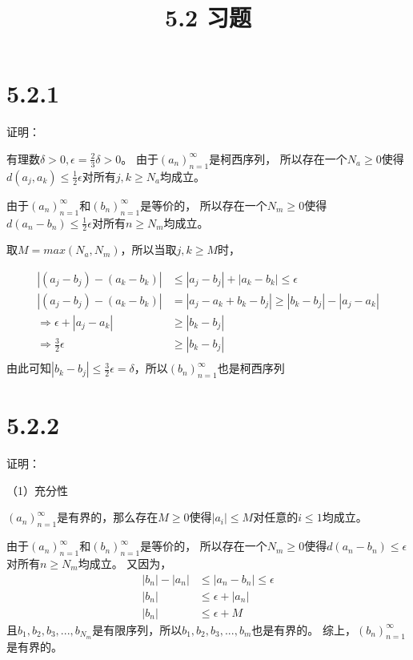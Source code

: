 \documentclass{article}
\theoremstyle{mystyle}
\begin{document}
\title{5.2 习题}
\maketitle

\section*{5.2.1}

证明：

有理数$\delta >0, \epsilon=\frac{2}{3}\delta > 0$。
由于$(a_n)_{n=1}^\infty$是柯西序列，
所以存在一个$N_a \geq 0$使得$d(a_j,a_k) \leq \frac{1}{2} \epsilon$对所有$j,k \geq N_a$均成立。

由于$(a_n)_{n=1}^\infty$和$(b_n)_{n=1}^\infty$是等价的，
所以存在一个$N_m \geq 0$使得$d(a_n-b_n) \leq \frac{1}{2} \epsilon$对所有$n \geq N_m$均成立。

取$M=max(N_a,N_m)$，所以当取$j,k \geq M$时，

\begin{align*}
  |(a_j-b_j) - (a_k - b_k)|          & \leq |a_j-b_j| + |a_k - b_k| \leq \epsilon       \\
  |(a_j-b_j) - (a_k - b_k)|          & = |a_j-a_k + b_k-b_j| \geq |b_k-b_j| - |a_j-a_k| \\
  \Rightarrow  \epsilon +  |a_j-a_k| & \geq |b_k-b_j|                                   \\
  \Rightarrow \frac{3}{2}\epsilon    & \geq |b_k-b_j|                                   \\
\end{align*}
由此可知$|b_k-b_j| \leq \frac{3}{2}\epsilon = \delta$，所以$(b_n)_{n=1}^\infty$也是柯西序列

\section*{5.2.2}

证明：

（1）充分性

$(a_n)_{n=1}^\infty$是有界的，那么存在$M \geq 0$使得$|a_i| \leq M$对任意的$i \leq 1$均成立。

由于$(a_n)_{n=1}^\infty$和$(b_n)_{n=1}^\infty$是等价的，
所以存在一个$N_m \geq 0$使得$d(a_n-b_n) \leq \epsilon$对所有$n \geq N_m$均成立。
又因为，
\begin{align*}
  |b_n| - |a_n| & \leq |a_n - b_n| \leq \epsilon \\
  |b_n|         & \leq \epsilon + |a_n|          \\
  |b_n|         & \leq \epsilon + M
\end{align*}
且$b_1,b_2,b_3,...,b_{N_m}$是有限序列，所以$b_1,b_2,b_3,...,b_m$也是有界的。
综上，$(b_n)_{n=1}^\infty$是有界的。
\end{document}

